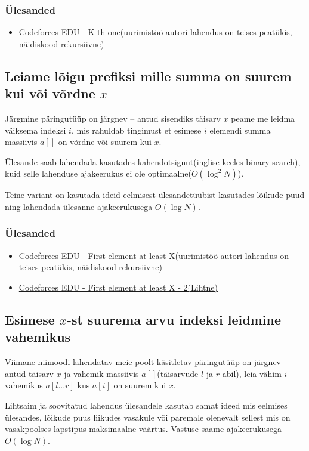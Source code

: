 \documentclass{trkut}
\begin{document}
\subsubsection{Ülesanded}
\begin{itemize}
    \item Codeforces EDU - K-th one(uurimistöö autori lahendus on teises peatükis, näidiskood rekursiivne)
\end{itemize}

\subsection{Leiame lõigu prefiksi mille summa on suurem kui või võrdne \texorpdfstring{$x$}{TEXT}}
Järgmine päringutüüp on järgnev -- antud sisendiks täisarv $x$ peame me leidma väiksema indeksi $i$, mis rahuldab tingimust et esimese $i$ elemendi summa massiivis $a[]$ on võrdne või suurem kui $x$.

Ülesande saab lahendada kasutades kahendotsignut(inglise keeles binary search), kuid selle lahenduse ajakeerukus ei ole optimaalne($O(\log^2 N)$)\parencite{usaco}.

Teine variant on kasutada ideid eelmisest ülesandetüübist kasutades lõikude puud ning lahendada ülesanne ajakeerukusega $O(\log N)$. \parencite{EMaxx}

\subsubsection{Ülesanded}
\begin{itemize}
    \item Codeforces EDU - First element at least X(uurimistöö autori lahendus on teises peatükis, näidiskood rekursiivne)
    \item  \href{https://codeforces.com/edu/course/2/lesson/4/2/practice/contest/273278/problem/D}{Codeforces EDU - First element at least X - 2(Lihtne)}
\end{itemize}
\subsection{Esimese \texorpdfstring{$x$}{TEXT}-st suurema arvu indeksi leidmine vahemikus}
Viimane niimoodi lahendatav meie poolt käsitletav päringutüüp on järgnev -- antud täisarv $x$ ja vahemik massiivis $a[]$(täisarvude $l$ ja $r$ abil), leia vähim $i$ vahemikus $a[l...r]$ kus $a[i]$ on suurem kui $x$. 

Lihtsaim ja soovitatud lahendus ülesandele kasutab samat ideed mis eelmises ülesandes, lõikude puus liikudes vasakule või paremale olenevalt sellest mis on vasakpoolses lapstipus maksimaalne väärtus. Vastuse saame ajakeerukusega $O(\log N)$. \parencite{EMaxx}
\end{document}
